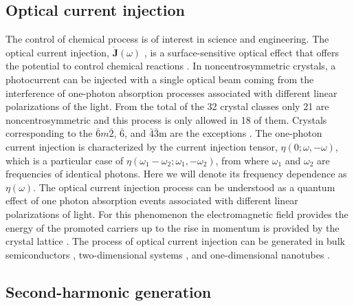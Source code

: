 \documentclass[pss]{wiley2sp} %
\begin{document}
\subsection{Optical current injection}

The control of chemical process is of interest in science and engineering. The optical current injection, $\mathbf{\dot{J}}(\omega)$ , is a surface-sensitive optical effect that offers the potential to control chemical reactions \cite{bhatPRB05,hachePRL97}. In noncentrosymmetric crystals, a photocurrent can be injected with a single optical beam coming  from the interference of one-photon absorption processes associated with different linear polarizations of the light. From the total of the 32 crystal classes only 21 are noncentrosymmetric and this process is only allowed in 18 of them. Crystals corresponding to the $\bar{6}m\bar{2}$, $\bar{6}$, and $\bar{4}$$\bar{3}$m are the exceptions \cite{sipePRB00}. The one-photon current injection is characterized by the current injection tensor, $\eta(0; \omega, − \omega)$, which is a particular case of $\eta(\omega_{1}-\omega_{2}; \omega_{1},-\omega_{2})$, from where $\omega_{1}$ and $\omega_{2}$ are frequencies of identical photons. Here we will denote its frequency dependence as $\eta(\omega)$. The optical current injection process can be understood as a quantum effect of one photon absorption events associated with different linear polarizations of light. For this phenomenon the electromagnetic field provides the energy of the promoted carriers up to the rise in momentum is provided by the crystal lattice \cite{arzatePRB14}. The process of optical current injection can be generated in bulk semiconductors \cite{hachePRL97,sipePRB00}, two-dimensional systems \cite{melePRB00,cabellosPRB11}, and one-dimensional nanotubes \cite{melePRB00}. 

\subsection{Second-harmonic generation}
\end{document}

